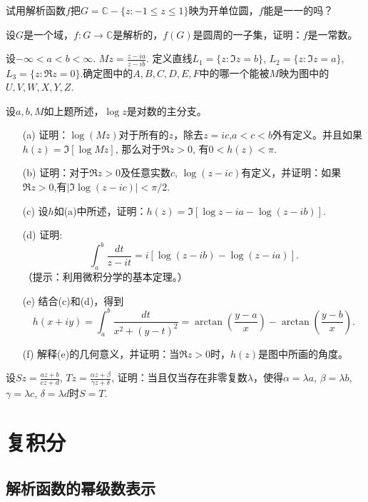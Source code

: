 \begin{problemset}
\item 试用解析函数$f$把$G = \mathbb{C} - \{z:-1  \le z \le 1\}$映为开单位圆，$f$能是一一的吗？

\item 设$G$是一个域，$f: G \to \mathbb{C}$是解析的，$f(G)$是圆周的一子集，证明：$f$是一常数。

\item 设$-\infty < a < b < \infty$. $Mz = \frac{z-ia}{z-ib}$. 定义直线$L_1 = \{z:\Im{z}=b\}$, $L_2 = \{z:\Im{z}=a\}$, $L_3=\{z:\Re{z}=0\}$.确定图中的$A, B, C, D, E, F$中的哪一个能被$M$映为图中的$U,V,W,X,Y,Z$.

\item 设$a,b,M$如上题所述，$\log{z}$是对数的主分支。
\begin{enumerate}
\item[(a)]证明：$\log{(Mz)}$对于所有的$z$，除去$z=ic$,$a<c<b$外有定义。并且如果$h(z)=\Im{[\log{Mz}]}$, 那么对于$\Re{z} > 0$, 有$0 < h(z) < \pi$.
\item[(b)]证明：对于$\Re{z} > 0$及任意实数$c$, $\log{(z-ic)}$有定义，并证明：如果$\Re{z}>0$,有$|\Im{\log{(z-ic)}}|<\pi/2$. 
\item[(c)]设$h$如(a)中所述，证明：$h(z)=\Im{[\log{z-ia} - \log{(z-ib)}]}$.
\item[(d)]证明:
\[
\int_{a}^{b}{\frac{dt}{z-it}} = i[\log{(z-ib)} - \log{(z-ia)}].
\]
（提示：利用微积分学的基本定理。）
\item[(e)]结合(c)和(d)，得到
\[
h(x+iy) = \int_{a}^{b}{\frac{dt}{x^2 + (y-t)^2}} = \arctan{(\frac{y-a}{x})} - \arctan{(\frac{y-b}{x})}.
\]
\item[(f)]解释(e)的几何意义，并证明：当$\Re{z}>0$时，$h(z)$是图中所画的角度。
\end{enumerate}

\item\label{exer002030320}设$Sz = \frac{az+b}{cz+d}$, $Tz = \frac{\alpha{}z + \beta}{\gamma{}z + \delta}$, 证明：当且仅当存在非零复数$\lambda$，使得$\alpha = \lambda{}a$, $\beta = \lambda{}b$, $\gamma = \lambda{}c$, $\delta = \lambda{}d$时$S = T$.

\end{problemset}






\chapter{复积分}\label{chapter00204}

\section{解析函数的幂级数表示}\label{section0020402}

